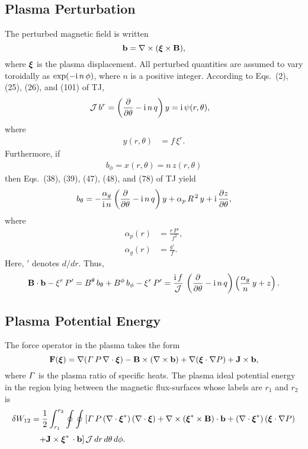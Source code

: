 \documentclass[12pt,prb,aps,notitlepage]{revtex4-1}
\newcommand{\bxi}{\mbox{\boldmath$\xi$}}
\begin{document}
\subsection{Plasma Perturbation}
The perturbed magnetic field is written 
\begin{equation}
{\bf b} = \nabla\times (\bxi\times{\bf B}),
\end{equation}
where $\bxi$ is the plasma displacement. All perturbed quantities are assumed to vary toroidally as $\exp(-{\rm i}\,n\,\phi)$,
where $n$ is a positive integer. According to Eqs.~(2), (25), (26), and
(101) of TJ, 
\begin{align}\label{e9}
{\cal J}\,b^r&=\left(\frac{\partial}{\partial\theta}-{\rm i}\,n\,q\right)y = {\rm i}\,\psi(r,\theta),
\end{align}
where
\begin{align}\label{e10}
y(r,\theta)&= f\,\xi^r.
\end{align}
Furthermore, if
\begin{align}
b_\phi = x(r,\theta)= n\,z(r,\theta)
\end{align}
then Eqs.~(38), (39), (47), (48), and (78) of TJ yield
\begin{align}
b_\theta = -\frac{\alpha_g}{{\rm i}\,n}\left(\frac{\partial}{\partial\theta} - {\rm i}\,n\,q\right)y +\alpha_p\,R^{\,2}\,y +{\rm i}\,\frac{\partial z}{\partial\theta},
\end{align}
where
\begin{align}
\alpha_p(r) &= \frac{r\,P'}{f^2},\label{ap}\\[0.5ex]
\alpha_g (r)&= \frac{g'}{f}.\label{ag}
\end{align}
Here, $'$ denotes $d/dr$. 
Thus,
\begin{equation}\label{e15}
{\bf B}\cdot{\bf b} -\xi^r\,P' = B^\theta\,b_\theta+B^\phi\,b_\phi - \xi^r\,P'=
\frac{{\rm i}\,f}{\cal J}\,\left(\frac{\partial}{\partial\theta}- {\rm i}\,n\,q\right)\left(\frac{\alpha_g}{n}\,y+z\right).
\end{equation}

\subsection{Plasma Potential Energy}
The force operator in the plasma takes the form 
\begin{equation}
{\bf F}(\bxi)= \nabla({\mit\Gamma}\,P\,\nabla\cdot\bxi) - {\bf B}\times(\nabla\times {\bf b})+\nabla(\bxi\cdot\nabla P)+{\bf J}\times  {\bf b},
\end{equation}
where ${\mit\Gamma}$ is the plasma ratio of specific heats. 
The plasma ideal potential energy in the region lying between the magnetic  flux-surfaces whose labels are $r_1$ and $r_2$ is 
\begin{align}
\delta W_{12} &= \frac{1}{2}\int_{r_1}^{r_2}\oint\oint\left[{\mit\Gamma}\,P\,(\nabla\cdot\bxi^\ast)\,(\nabla\cdot\bxi)+ \nabla\times (\bxi^\ast\times {\bf B})\cdot {\bf b}
+(\nabla\cdot\bxi^\ast)\,(\bxi\cdot\nabla P)\right.\nonumber\\[0.5ex]&\phantom{=}
\left.+{\bf J}\times \bxi^\ast\,\cdot{\bf b}\right]{\cal J}\,dr\,d\theta\,d\phi.
\end{align}
\end{document}
